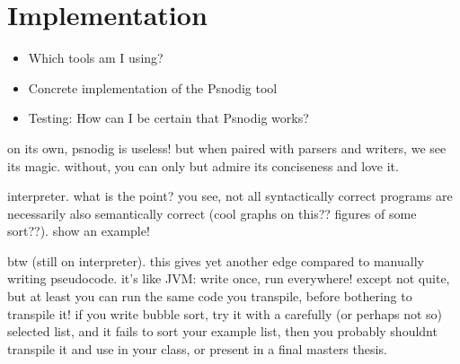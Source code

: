 \chapter{Implementation}
\begin{itemize}
    \item Which tools am I using?
    \item Concrete implementation of the Psnodig tool
    \item Testing: How can I be certain that Psnodig works?
\end{itemize}

on its own, psnodig is useless! but when paired with parsers and writers, we see its magic. without, you can only but admire its conciseness and love it.

interpreter. what is the point? you see, not all syntactically correct programs are necessarily also semantically correct (cool graphs on this?? figures of some sort??). show an example!

btw (still on interpreter). this gives yet another edge compared to manually writing pseudocode. it's like JVM: write once, run everywhere! except not quite, but at least you can run the same code you transpile, before bothering to transpile it! if you write bubble sort, try it with a carefully (or perhaps not so) selected list, and it fails to sort your example list, then you probably shouldnt transpile it and use in your class, or present in a final masters thesis.